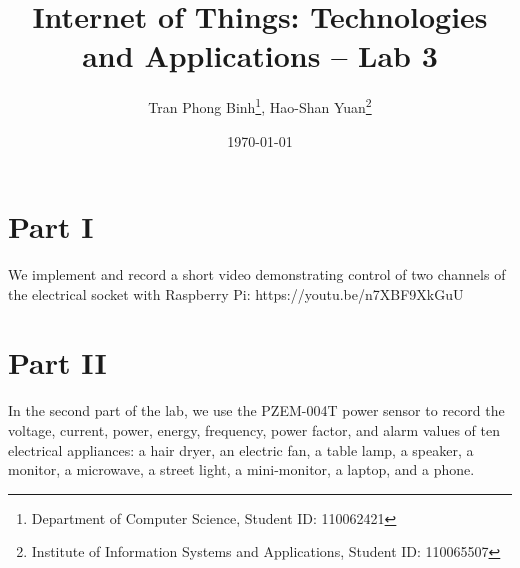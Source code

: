 \documentclass[12pt, a4paper, onside]{article}
\title{\textbf{Internet of Things: Technologies and Applications -- Lab 3}}
\author{Tran Phong Binh\thanks{Department of Computer Science, Student ID: 110062421}, Hao-Shan Yuan\thanks{Institute of Information Systems and Applications, Student ID: 110065507}}
\affil{National Tsing Hua University}
\date{\today}
\begin{document}
\maketitle

\section{Part I}
We implement and record a short video demonstrating control of two channels of the electrical socket with Raspberry Pi: https://youtu.be/n7XBF9XkGuU

\section{Part II}
In the second part of the lab, we use the PZEM-004T power sensor to record the voltage, current, power, energy, frequency, power factor, and alarm values of ten electrical appliances: a hair dryer, an electric fan, a table lamp, a speaker, a monitor, a microwave, a street light, a mini-monitor, a laptop, and a phone.
\end{document}
